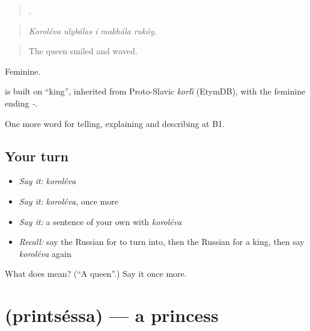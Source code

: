 \begin{quote}
    .
\end{quote}

\begin{quote}
\emph{Koroléva ulybálas i makhála rukóy.}
\end{quote}

\begin{quote}
The queen smiled and waved.
\end{quote}

Feminine.

\begin{cousinweb}
\emph{} is built on \emph{} \textquotedblleft{}king\textquotedblright{}, inherited from Proto-Slavic \emph{korľĭ} (EtymDB), with the feminine ending \emph{-}.
\end{cousinweb}

\begin{grammarlens}[title={What you've built}]
One more word for telling, explaining and describing at B1.
\end{grammarlens}

\subsection*{Your turn}
\begin{itemize}
\raggedright
  \item \emph{Say it:} \emph{koroléva}
  \item \emph{Say it:} \emph{koroléva}, once more
  \item \emph{Say it:} a sentence of your own with \emph{koroléva}
  \item \emph{Recall:} say the Russian for to turn into, then the Russian for a king, then say \emph{koroléva} again
\end{itemize}

\begin{tcolorbox}[breakable,colback=teal!4,colframe=teal!35!black,title={Before you move on}]
What does  mean? (\textquotedblleft{}A queen\textquotedblright{}.) Say it once more.
\end{tcolorbox}
\section[\texorpdfstring{\ru{принцесса} (printséssa)}{принцесса (printséssa)}]{ (printséssa) — a princess}

